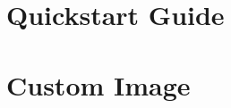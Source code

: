 \documentclass[a4paper,11pt]{article}
\begin{document}


\part{Quickstart Guide}

\newpage

\part{Custom Image}

\end{document}
